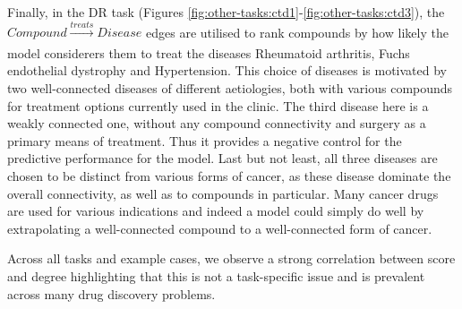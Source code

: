 Finally, in the DR task (Figures \ref{fig:other-tasks:ctd1}-\ref{fig:other-tasks:ctd3}), the \(\mathit{Compound} \xrightarrow[]{\mathit{treats}} \mathit{Disease}\) edges are utilised to rank compounds by how likely the model considerers them to treat the diseases Rheumatoid arthritis, Fuchs endothelial dystrophy and Hypertension. This choice of diseases is motivated by two well-connected diseases of different aetiologies, both with various compounds for treatment options currently used in the clinic. The third disease here is a weakly connected one, without any compound connectivity and surgery as a primary means of treatment. Thus it provides a negative control for the predictive performance for the model. Last but not least, all three diseases are chosen to be distinct from various forms of cancer, as these disease dominate the overall connectivity, as well as to compounds in particular. Many cancer drugs are used for various indications and indeed a model could simply do well by extrapolating a well-connected compound to a well-connected form of cancer.

Across all tasks and example cases, we observe a strong correlation between score and degree highlighting that this is not a task-specific issue and is prevalent across many drug discovery problems.

